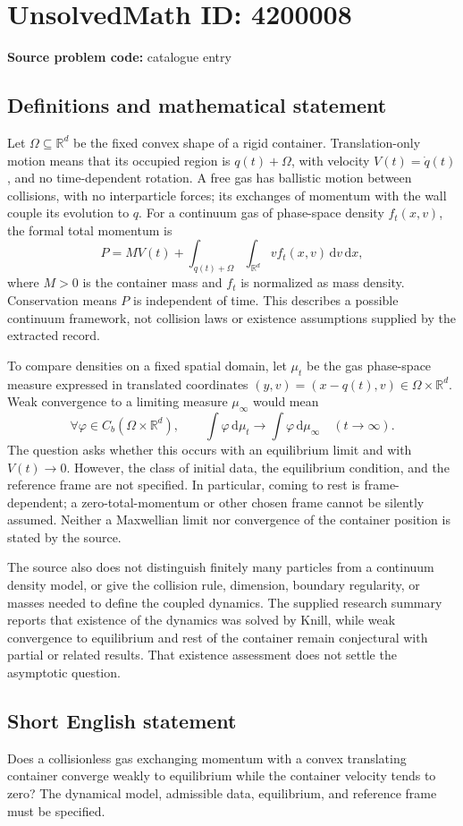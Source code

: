 \documentclass[11pt]{article}
\newcommand{\R}{\mathbb{R}}
\begin{document}
\section*{UnsolvedMath ID: 4200008}
\textbf{Source problem code:} catalogue entry
\subsection{Definitions and mathematical statement}
Let \(\Omega\subseteq\R^d\) be the fixed convex shape of a rigid container. Translation-only motion means that its occupied region is \(q(t)+\Omega\), with velocity \(V(t)=\dot q(t)\), and no time-dependent rotation. A free gas has ballistic motion between collisions, with no interparticle forces; its exchanges of momentum with the wall couple its evolution to \(q\). For a continuum gas of phase-space density \(f_t(x,v)\), the formal total momentum is
\[
P=M V(t)+\int_{q(t)+\Omega}\int_{\R^d}v f_t(x,v)\,\mathrm dv\,\mathrm dx,
\]
where \(M>0\) is the container mass and \(f_t\) is normalized as mass density. Conservation means \(P\) is independent of time. This describes a possible continuum framework, not collision laws or existence assumptions supplied by the extracted record.

To compare densities on a fixed spatial domain, let \(\mu_t\) be the gas phase-space measure expressed in translated coordinates \((y,v)=(x-q(t),v)\in\Omega\times\R^d\). Weak convergence to a limiting measure \(\mu_\infty\) would mean
\[
\forall\varphi\in C_b(\Omega\times\R^d),\qquad
\int\varphi\,\mathrm d\mu_t\longrightarrow\int\varphi\,\mathrm d\mu_\infty
\quad(t\to\infty).
\]
The question asks whether this occurs with an equilibrium limit and with \(V(t)\to0\). However, the class of initial data, the equilibrium condition, and the reference frame are not specified. In particular, coming to rest is frame-dependent; a zero-total-momentum or other chosen frame cannot be silently assumed. Neither a Maxwellian limit nor convergence of the container position is stated by the source.

The source also does not distinguish finitely many particles from a continuum density model, or give the collision rule, dimension, boundary regularity, or masses needed to define the coupled dynamics. The supplied research summary reports that existence of the dynamics was solved by Knill, while weak convergence to equilibrium and rest of the container remain conjectural with partial or related results. That existence assessment does not settle the asymptotic question.
\subsection{Short English statement}
Does a collisionless gas exchanging momentum with a convex translating container converge weakly to equilibrium while the container velocity tends to zero? The dynamical model, admissible data, equilibrium, and reference frame must be specified.
\end{document}
